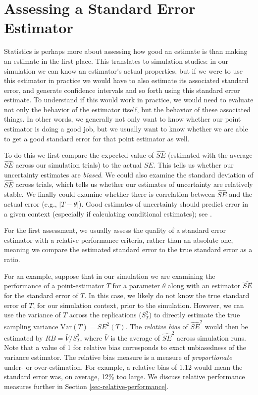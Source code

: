 \documentclass[
]{book}
\begin{document}
\section{Assessing a Standard Error Estimator}\label{assessing-a-standard-error-estimator}

Statistics is perhaps more about assessing how good an estimate is than making an estimate in the first place.
This translates to simulation studies: in our simulation we can know an estimator's actual properties, but if we were to use this estimator in practice we would have to also estimate its associated standard error, and generate confidence intervals and so forth using this standard error estimate.
To understand if this would work in practice, we would need to evaluate not only the behavior of the estimator itself, but the behavior of these associated things.
In other words, we generally not only want to know whether our point estimator is doing a good job, but we usually want to know whether we are able to get a good standard error for that point estimator as well.

To do this we first compare the expected value of \(\widehat{SE}\) (estimated with the average \(\widehat{SE}\) across our simulation trials) to the actual \(SE\).
This tells us whether our uncertainty estimates are \emph{biased}.
We could also examine the standard deviation of \(\widehat{SE}\) across trials, which tells us whether our estimates of uncertainty are relatively stable.
We finally could examine whether there is correlation between \(\widehat{SE}\) and the actual error (e.g., \(\left|T - \theta \right|\)).
Good estimates of uncertainty should predict error in a given context (especially if calculating conditional estimates); see \citet{sundberg2003conditional}.

For the first assessment, we usually assess the quality of a standard error estimator with a relative performance criteria, rather than an absolute one, meaning we compare the estimated standard error to the true standard error as a ratio.

For an example, suppose that in our simulation we are examining the performance of a point-estimator \(T\) for a parameter \(\theta\) along with an estimator \(\widehat{SE}\) for the standard error of \(T\).
In this case, we likely do not know the true standard error of \(T\), for our simulation context, prior to the simulation.
However, we can use the variance of \(T\) across the replications (\(S_T^2\)) to directly estimate the true sampling variance \(\text{Var}(T) = SE^2(T)\).
The \emph{relative bias} of \(\widehat{SE}^2\) would then be estimated by \(RB = \bar{V} / S_T^2\), where \(\bar{V}\) is the average of \(\widehat{SE}^2\) across simulation runs.
Note that a value of 1 for relative bias corresponds to exact unbiasedness of the variance estimator.
The relative bias measure is a measure of \emph{proportionate} under- or over-estimation.
For example, a relative bias of 1.12 would mean the standard error was, on average, 12\% too large.
We discuss relative performance measures further in Section \ref{sec-relative-performance}.
\end{document}
